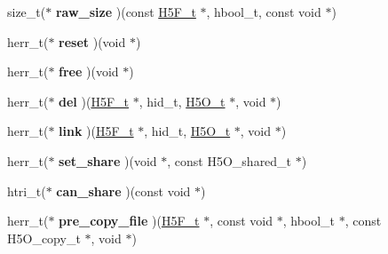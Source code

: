\begin{DoxyCompactItemize}
\mbox{\label{struct_h5_o__msg__class__t_a06dbf0d09295a23dc3ebe7af1b2d670a}} 
size\+\_\+t($\ast$ {\bfseries raw\+\_\+size} )(const \hyperlink{struct_h5_f__t}{H5\+F\+\_\+t} $\ast$, hbool\+\_\+t, const void $\ast$)
\item 
\mbox{\label{struct_h5_o__msg__class__t_a5381b1a1dc77938f5952e8385e6fdbea}} 
herr\+\_\+t($\ast$ {\bfseries reset} )(void $\ast$)
\item 
\mbox{\label{struct_h5_o__msg__class__t_aa2fcb36510a4b77818993f672d34d684}} 
herr\+\_\+t($\ast$ {\bfseries free} )(void $\ast$)
\item 
\mbox{\label{struct_h5_o__msg__class__t_aefae946dd8e2fb19f95571b8e17fcb10}} 
herr\+\_\+t($\ast$ {\bfseries del} )(\hyperlink{struct_h5_f__t}{H5\+F\+\_\+t} $\ast$, hid\+\_\+t, \hyperlink{struct_h5_o__t}{H5\+O\+\_\+t} $\ast$, void $\ast$)
\item 
\mbox{\label{struct_h5_o__msg__class__t_a4fa232ffb8f4eb46882562702e5d257b}} 
herr\+\_\+t($\ast$ {\bfseries link} )(\hyperlink{struct_h5_f__t}{H5\+F\+\_\+t} $\ast$, hid\+\_\+t, \hyperlink{struct_h5_o__t}{H5\+O\+\_\+t} $\ast$, void $\ast$)
\item 
\mbox{\label{struct_h5_o__msg__class__t_adb33b2f772c0692c28eaa032cd4bda06}} 
herr\+\_\+t($\ast$ {\bfseries set\+\_\+share} )(void $\ast$, const H5\+O\+\_\+shared\+\_\+t $\ast$)
\item 
\mbox{\label{struct_h5_o__msg__class__t_ab3033a9cb9d52becf65c6be9a5ca1428}} 
htri\+\_\+t($\ast$ {\bfseries can\+\_\+share} )(const void $\ast$)
\item 
\mbox{\label{struct_h5_o__msg__class__t_a7c0bd6f8fe70032225885b37ffff4ba2}} 
herr\+\_\+t($\ast$ {\bfseries pre\+\_\+copy\+\_\+file} )(\hyperlink{struct_h5_f__t}{H5\+F\+\_\+t} $\ast$, const void $\ast$, hbool\+\_\+t $\ast$, const H5\+O\+\_\+copy\+\_\+t $\ast$, void $\ast$)
\item 
\mbox{\label{struct_h5_o__msg__class__t_a6dc7772c0eb66e623876e44dc74ee397}} 

\end{DoxyCompactItemize}

